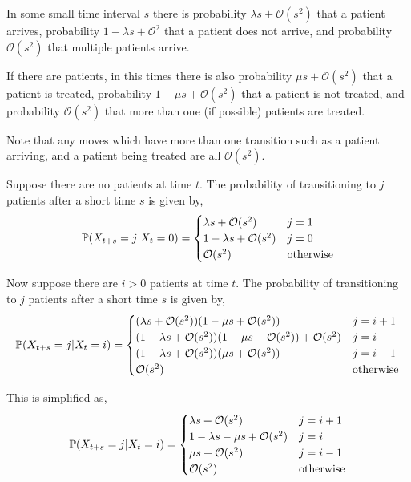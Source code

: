 \documentclass[10pt]{article}
\begin{document}
\begin{solution}[Solution]
In some small time interval \( s \) there is probability \( \lambda s + \mathcal{O}(s^2) \) that a patient arrives, probability \( 1-\lambda s + \mathcal{O}^2 \) that a patient does not arrive, and probability \( \mathcal{O}(s^2) \) that multiple patients arrive.

If there are patients, in this times there is also probability \( \mu s + \mathcal{O}(s^2) \) that a patient is treated, probability \( 1- \mu s + \mathcal{O}(s^2) \) that a patient is not treated, and probability \( \mathcal{O}(s^2) \) that more than one (if possible) patients are treated.

Note that any moves which have more than one transition such as a patient arriving, and a patient being treated are all \( \mathcal{O}(s^2) \).

Suppose there are no patients at time \( t \). The probability of transitioning to \( j \) patients after a short time \( s \) is given by,
\begin{align*}
    \mathbb{P}(X_{t+s} = j | X_{t} = 0) = 
    \begin{cases}
        \lambda s + \mathcal{O}(s^2) & j=1 \\
        1-\lambda s + \mathcal{O}(s^2) & j=0 \\
        \mathcal{O}(s^2) & \text{otherwise}
    \end{cases}
\end{align*}

Now suppose there are \( i>0 \) patients at time \( t \). The probability of transitioning to \( j \) patients after a short time \( s \) is given by,
\begin{align*}
    \mathbb{P}(X_{t+s} = j | X_{t} = i) = 
    \begin{cases}
        (\lambda s + \mathcal{O}(s^2))(1-\mu s + \mathcal{O}(s^2)) & j=i+1 \\
        (1-\lambda s + \mathcal{O}(s^2))(1-\mu s + \mathcal{O}(s^2)) + \mathcal{O}(s^2) & j=i \\
        (1-\lambda s + \mathcal{O}(s^2))(\mu s + \mathcal{O}(s^2)) & j=i-1 \\
        \mathcal{O}(s^2) & \text{otherwise}
    \end{cases}
\end{align*}

This is simplified as,
\begin{align*}
    \mathbb{P}(X_{t+s}=j | X_t = i) = 
    \begin{cases}
        \lambda s + \mathcal{O}(s^2) & j=i+1 \\
        1-\lambda s -\mu s +\mathcal{O}(s^2) & j=i \\
        \mu s + \mathcal{O}(s^2) & j=i-1 \\
        \mathcal{O}(s^2) & \text{otherwise}
    \end{cases}
\end{align*}



\end{solution}
\end{document}
